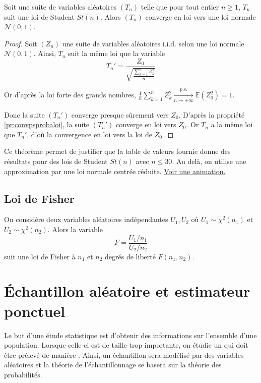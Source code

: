 \begin{theoreme}{}{}
 Soit une suite de variables aléatoires $(T_n)$  telle que pour tout entier $n \geq 1$, $T_n$ suit une loi de Student $St(n)$. Alors $(T_n)$ converge en loi vers une loi normale $\mathcal{N}(0,1)$.
\end{theoreme}
\begin{proof}
  Soit $(Z_n)$ une suite de variables aléatoires i.i.d. selon une loi normale $\mathcal{N}(0,1)$. Ainsi, $T_n$ suit la même loi que la variable 
  $$T_n' = \frac{Z_0}{\sqrt{\frac{\sum_{k=1}^n Z_k^2}{n}}}$$
  
  Or d'après la loi forte des grands nombres, $ \frac{1}{n}\sum_{k=1}^n Z_k^2 \xrightarrow[n\to+\infty]{p.s.} \mathbb{E}(Z_0^2) = 1$.
  
  Donc la suite $(T_n')$ converge presque sûrement vers $Z_0$. D'après la propriété \ref{pr:convpsprobaloi}, la suite 
 $(T_n')$ converge en loi vers $Z_0$. Or $T_n$ a la même loi que $T_n'$, d'où la convergence en loi vers la loi de $Z_0$.
\end{proof}

Ce théorème permet de justifier que la table de valeurs fournie donne des résultats pour des lois de Student $St(n)$ avec $n \leq 30$. Au delà, on utilise une approximation par une loi normale centrée réduite. \href{https://www.geogebra.org/m/IvVDw5y3}{Voir une animation.}


\subsection{Loi de Fisher}
\begin{definition}{}{}
	On considère deux variables aléatoires indépendantes $U_1,U_2$ où  $U_1 \sim \chi^2(n_1)$ et $U_2 \sim \chi^2(n_2)$. Alors la variable $$F=\frac{U_1/n_1}{U_2/n_2}$$ suit une loi de Fisher à $n_1$ et $n_2$ degrés de liberté $F(n_1,n_2)$.
\end{definition}



\section{\'Echantillon aléatoire et estimateur ponctuel}

Le but d'une étude statistique est d'obtenir des informations sur l'ensemble d'une population. Lorsque celle-ci est de taille trop importante, on étudie un  qui doit être prélevé de manière . Ainsi, un échantillon sera modélisé par des variables aléatoires et la théorie de l'échantillonnage se basera sur la théorie des probabilités.

